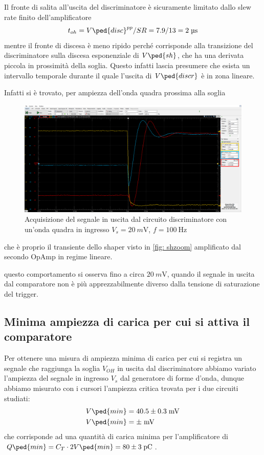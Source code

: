 \documentclass[10pt,a4paper]{article}
\begin{document}
Il fronte di salita all'uscita del discriminatore è sicuramente limitato dallo
slew rate finito dell'amplificatore
\[
t_{oh} = V\ped{disc}^{pp}/SR = 7.9 / 13 = 2 \; \si{\micro\s}
\]
mentre il fronte di discesa è meno ripido perché corrisponde alla transizione
del discriminatore sulla discesa esponenziale di $V\ped{sh}$, che ha una derivata
piccola in prossimità della soglia. Questo infatti lascia presumere che esista
un intervallo temporale durante il quale l'uscita di $V\ped{discr}$ è in zona
lineare.

Infatti si è trovato, per ampiezza dell'onda quadra prossima alla soglia
\begin{figure}[htbp]
\centering
\includegraphics[scale=0.335]{shdiscthr}
\caption{Acquisizione del segnale in uscita dal circuito discriminatore con
un'onda quadra in ingresso $V_s = \SI{20}{m\V}$, $f = \SI{100}{\Hz}$
\label{fig: discrthr}}
\end{figure}
che è proprio il transiente dello shaper visto in \ref{fig: shzoom} amplificato
dal secondo OpAmp in regime lineare.

questo comportamento si osserva fino a circa $\SI{20}{m\V}$, quando il segnale
in uscita dal comparatore non è più apprezzabilmente diverso dalla tensione di
saturazione del trigger.

\subsection{Minima ampiezza di carica per cui si attiva il comparatore}
Per ottenere una misura di ampiezza minima di carica per cui si registra un
segnale che raggiunga la soglia $V_{OH}$ in uscita dal discriminatore abbiamo
variato l'ampiezza del segnale in ingresso $V_s$ dal generatore di forme
d'onda, dunque abbiamo misurato con i cursori l'ampiezza critica trovata per
i due circuiti studiati:
\begin{align*}
V\ped{min} &= 40.5 \pm 0.3 \; \si{m\V} \\ 
V\ped{min} &=  \pm  \; \si{m\V}
\end{align*}
che corrisponde ad una quantità di carica minima per l'amplificatore di
$Q\ped{min} = C_T \cdot 2V\ped{min} = 80 \pm  3 \; \si{\pico\coulomb}$.
\end{document}
